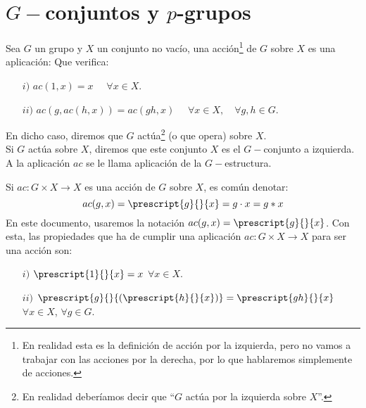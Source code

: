 \chapter{$G-$conjuntos y $p$-grupos}
\begin{definicion}
    Sea $G$ un grupo y $X$ un conjunto no vacío, una acción\footnote{En realidad esta es la definición de acción por la izquierda, pero no vamos a trabajar con las acciones por la derecha, por lo que hablaremos simplemente de acciones.} de $G$ sobre $X$ es una aplicación: 
    Que verifica:
    \begin{enumerate}
        \item[$i)$] $ac(1,x) = x$ $\quad \forall x\in X$.
        \item[$ii)$] $ac(g, ac(h, x)) = ac(gh, x)$ $\quad \forall x\in X, \quad \forall g,h\in G$.
    \end{enumerate}
    En dicho caso, diremos que $G$ actúa\footnote{En realidad deberíamos decir que ``$G$ actúa por la izquierda sobre $X$''.} (o que opera) sobre $X$.\\

    \noindent
    Si $G$ actúa sobre $X$, diremos que este conjunto $X$ es el $G-$conjunto a izquierda. A la aplicación $ac$ se le llama aplicación de la $G-$estructura.
\end{definicion}

\begin{notacion}
    Si $ac:G\times X\to X$ es una acción de $G$ sobre $X$, es común denotar:
    \begin{equation*}
        ac(g,x) = \prescript{g}{}{x} = g\cdot x = g\ast x
    \end{equation*}
    En este documento, usaremos la notación $ac(g,x) = \prescript{g}{}{x}$. Con esta, las propiedades que ha de cumplir una aplicación $ac:G\times X\to X$ para ser una acción son:
    \begin{enumerate}
        \item[$i)$] $\prescript{1}{}{x} = x$ $\forall x\in X$.
        \item[$ii)$] $\prescript{g}{}{(\prescript{h}{}{x})} = \prescript{gh}{}{x}$ $\forall x\in X$, $\forall g\in G$.
    \end{enumerate}
\end{notacion}

